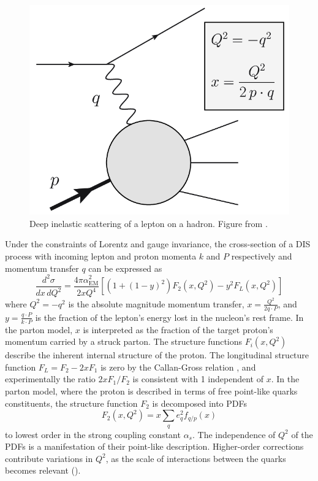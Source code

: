 \begin{figure}[t]
  \includegraphics{dis_electron_proton.png}
  \caption{Deep inelastic scattering of a lepton on a hadron. Figure from .
}
  \label{fig:dis}
\end{figure}

Under the constraints of Lorentz and gauge invariance, the cross-section of a \ac{DIS} process with incoming lepton and proton momenta $k$ and $P$ respectively and momentum transfer $q$ can be expressed as \cite{Tanabashi:2018oca}
\begin{equation}
  \frac{d^2 \sigma}{dx \, dQ^2} = \frac{4\pi\alpha^2_\textrm{EM}}{2xQ^4}\left[ \left(1+(1-y)^2\right) F_2\left(x, Q^2\right) - y^2 F_L \left(x, Q^2\right) \right]
  \label{eq:dis}
\end{equation}
where $Q^2 = -q^2$ is the absolute magnitude momentum transfer, $x = \frac{Q^2}{2q \cdot P}$, and $y = \frac{q \cdot P}{k \cdot P}$ is the fraction of the lepton's energy lost in the nucleon's rest frame.
In the parton model, $x$ is interpreted as the fraction of the target proton's momentum carried by a struck parton.
The structure functions $F_i(x, Q^2)$ describe the inherent internal structure of the proton.
The longitudinal structure function $F_L = F_2 - 2xF_1$ is zero by the Callan-Gross relation \cite{Callan:1969uq}, and experimentally the ratio $2xF_1 / F_2$ is consistent with 1 independent of $x$.
In the parton model, where the proton is described in terms of free point-like quarks constituents, the structure function $F_2$ is decomposed into \acp{PDF}
\begin{equation}
F_2 \left(x, Q^2\right) = x \sum_q e_q^2 f_{q/p}(x)
\end{equation}
to lowest order in the strong coupling constant $\alpha_s$.
The independence of $Q^2$ of the \acp{PDF} is a manifestation of their point-like description.
Higher-order corrections contribute variations in $Q^2$, as the scale of interactions between the quarks becomes relevant ().

